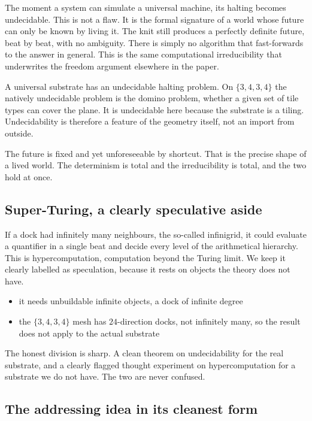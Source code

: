 The moment a system can simulate a universal machine, its halting becomes undecidable. This is not a flaw. It is the formal signature of a world whose future can only be known by living it. The knit still produces a perfectly definite future, beat by beat, with no ambiguity. There is simply no algorithm that fast-forwards to the answer in general. This is the same computational irreducibility that underwrites the freedom argument elsewhere in the paper.

\begin{theorem}
A universal substrate has an undecidable halting problem. On $\{3,4,3,4\}$ the natively undecidable problem is the domino problem, whether a given set of tile types can cover the plane. It is undecidable here because the substrate is a tiling. Undecidability is therefore a feature of the geometry itself, not an import from outside.
\end{theorem}

The future is fixed and yet unforeseeable by shortcut. That is the precise shape of a lived world. The determinism is total and the irreducibility is total, and the two hold at once.

\subsection{Super-Turing, a clearly speculative aside}

If a dock had infinitely many neighbours, the so-called infinigrid, it could evaluate a quantifier in a single beat and decide every level of the arithmetical hierarchy. This is hypercomputation, computation beyond the Turing limit. We keep it clearly labelled as speculation, because it rests on objects the theory does not have.

\begin{itemize}
\item it needs unbuildable infinite objects, a dock of infinite degree
\item the $\{3,4,3,4\}$ mesh has $24$-direction docks, not infinitely many, so the result does not apply to the actual substrate
\end{itemize}

The honest division is sharp. A clean theorem on undecidability for the real substrate, and a clearly flagged thought experiment on hypercomputation for a substrate we do not have. The two are never confused.

\subsection{The addressing idea in its cleanest form}

